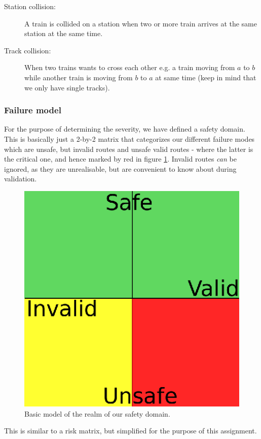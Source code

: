\documentclass[10pt,a4paper]{article}
\begin{document}
\begin{description}

\item[Station collision:]
A train is collided on a station when two or more train arrives at the same station at the same time.
\item[Track collision:]
When two trains wants to cross each other e.g. a train moving from $a$ to $b$ while another train is moving from $b$ to $a$ at same time (keep in mind that we only have single tracks).
\end{description}

\subsubsection{Failure model}
For the purpose of determining the severity, we have defined a safety domain. This is basically just a 2-by-2 matrix that categorizes our different failure modes which are unsafe, but invalid routes and unsafe valid routes - where the latter is the critical one, and hence marked by red in figure \ref{fig:safety_domain}. Invalid routes \emph{can} be ignored, as they are unrealisable, but are convenient to know about during validation.

\begin{figure}[h]
\centering
\includegraphics[scale=0.5]{fig/Safety_domains.eps}
 \caption{Basic model of the realm of our safety domain.}
 \label{fig:safety_domain}
\end{figure}
This is similar to a risk matrix, but simplified for the purpose of this assignment.
\end{document}
